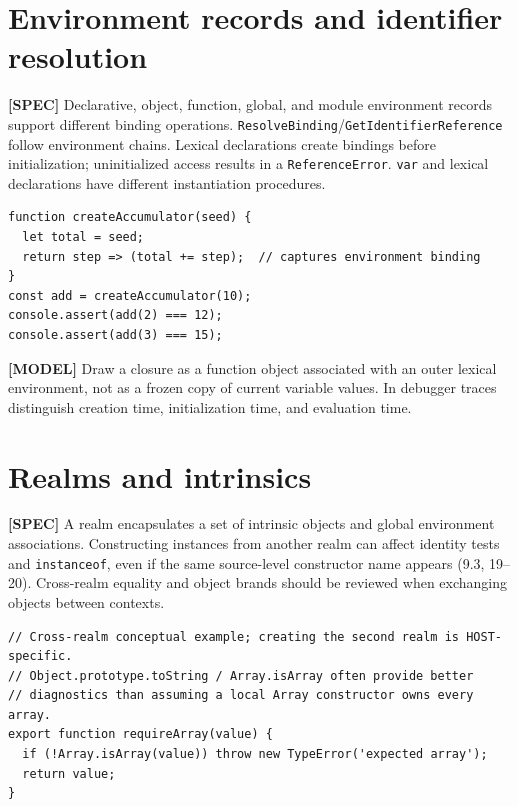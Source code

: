 \documentclass[11pt,letterpaper]{article}
\newcommand{\passthrough}[1]{#1}
\begin{document}
\section{Environment records and identifier resolution}\label{environment-records-and-identifier-resolution}

\textbf{{[}SPEC{]}} Declarative, object, function, global, and module environment records support different binding operations. \passthrough{\lstinline!ResolveBinding!}/\passthrough{\lstinline!GetIdentifierReference!} follow environment chains. Lexical declarations create bindings before initialization; uninitialized access results in a \passthrough{\lstinline!ReferenceError!}. \passthrough{\lstinline!var!} and lexical declarations have different instantiation procedures.

\begin{lstlisting}
function createAccumulator(seed) {
  let total = seed;
  return step => (total += step);  // captures environment binding
}
const add = createAccumulator(10);
console.assert(add(2) === 12);
console.assert(add(3) === 15);
\end{lstlisting}

\textbf{{[}MODEL{]}} Draw a closure as a function object associated with an outer lexical environment, not as a frozen copy of current variable values. In debugger traces distinguish creation time, initialization time, and evaluation time.

\section{Realms and intrinsics}\label{realms-and-intrinsics}

\textbf{{[}SPEC{]}} A realm encapsulates a set of intrinsic objects and global environment associations. Constructing instances from another realm can affect identity tests and \passthrough{\lstinline!instanceof!}, even if the same source-level constructor name appears (9.3, 19--20). Cross-realm equality and object brands should be reviewed when exchanging objects between contexts.

\begin{lstlisting}
// Cross-realm conceptual example; creating the second realm is HOST-specific.
// Object.prototype.toString / Array.isArray often provide better
// diagnostics than assuming a local Array constructor owns every array.
export function requireArray(value) {
  if (!Array.isArray(value)) throw new TypeError('expected array');
  return value;
}
\end{lstlisting}
\end{document}
